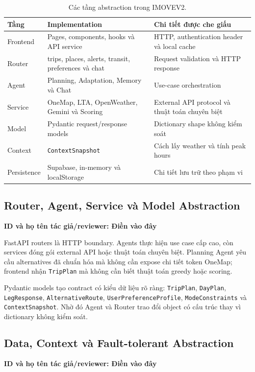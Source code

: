 \documentclass[12pt,a4paper]{article}
\newcommand{\tacgia}{%
  \begin{tcolorbox}[colback=blue!3,colframe=blue!25,boxrule=0.4pt,arc=1mm]
    \small\textbf{ID và họ tên tác giả/reviewer: Điền vào đây}
  \end{tcolorbox}
}
\begin{document}
\begin{table}[H]
\centering
\begin{tabularx}{\textwidth}{|L{3.2cm}|X|X|}
\hline
\textbf{Tầng} & \textbf{Implementation} & \textbf{Chi tiết được che giấu} \\ \hline
Frontend & Pages, components, hooks và API service & HTTP, authentication header và local cache \\ \hline
Router & trips, places, alerts, transit, preferences và chat & Request validation và HTTP response \\ \hline
Agent & Planning, Adaptation, Memory và Chat & Use-case orchestration \\ \hline
Service & OneMap, LTA, OpenWeather, Gemini và Scoring & External API protocol và thuật toán chuyên biệt \\ \hline
Model & Pydantic request/response models & Dictionary shape không kiểm soát \\ \hline
Context & \texttt{ContextSnapshot} & Cách lấy weather và tính peak hours \\ \hline
Persistence & Supabase, in-memory và localStorage & Chi tiết lưu trữ theo phạm vi \\ \hline
\end{tabularx}
\caption{Các tầng abstraction trong IMOVEV2.}
\label{tab:abstraction-layers}
\end{table}

\subsection{Router, Agent, Service và Model Abstraction}
\tacgia

FastAPI routers là HTTP boundary. Agents thực hiện use case cấp cao, còn services đóng gói external API hoặc thuật toán chuyên biệt. Planning Agent yêu cầu alternatives đã chuẩn hóa mà không cần expose chi tiết token OneMap; frontend nhận \texttt{TripPlan} mà không cần biết thuật toán greedy hoặc scoring.

Pydantic models tạo contract có kiểu dữ liệu rõ ràng: \texttt{TripPlan}, \texttt{DayPlan}, \texttt{LegResponse}, \texttt{AlternativeRoute}, \texttt{UserPreferenceProfile}, \texttt{ModeConstraints} và \texttt{ContextSnapshot}. Nhờ đó Agent và Router trao đổi object có cấu trúc thay vì dictionary không kiểm soát.

\subsection{Data, Context và Fault-tolerant Abstraction}
\tacgia
\end{document}
